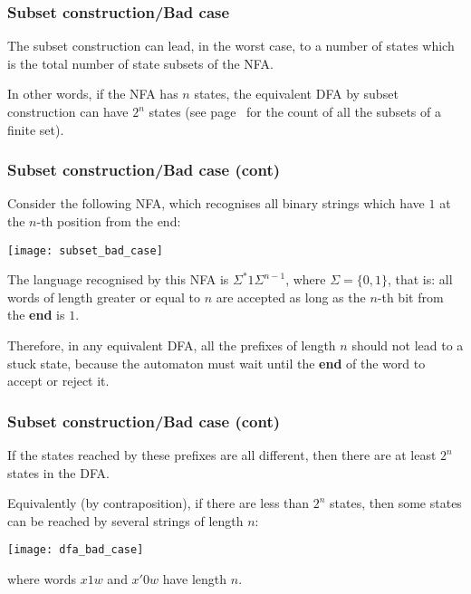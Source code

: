 % 
\begin{frame}
\frametitle{Subset construction/Bad case}

The subset construction can lead, in the worst case, to a number of
states which is the total number of state subsets of the NFA.

\bigskip

In other words, if the NFA has \(n\) states, the equivalent DFA by
subset construction can have \(2^n\) states (see
page~\pageref{state_explosion} for the count of all the subsets of a
finite set).

\end{frame}

% 
\begin{frame}
\frametitle{Subset construction/Bad case (cont)}

Consider the following NFA, which recognises all binary strings which
have \(1\) at the \(n\)-th position from the end:
\begin{center}
\texttt{[image: subset\_bad\_case]}
\end{center}
The language recognised by this NFA is \(\Sigma^{*} 1 \Sigma^{n-1}\),
where \(\Sigma=\{0,1\}\), that is: all words of length greater or
equal to \(n\) are accepted as long as the \(n\)-th bit from the
\textbf{end} is \(1\).

\bigskip

Therefore, in any equivalent DFA, all the prefixes of length \(n\)
should not lead to a stuck state, because the automaton must wait
until the \textbf{end} of the word to accept or reject it.

\end{frame}

% 
\begin{frame}
\frametitle{Subset construction/Bad case (cont)}

If the states reached by these prefixes are all different, then there
are at least \(2^n\) states in the DFA.

\bigskip

Equivalently (by contraposition), if there are less than \(2^n\)
states, then some states can be reached by several strings of length
\(n\):
\begin{center}
\texttt{[image: dfa\_bad\_case]}
\end{center}
where words \(x1w\) and \(x'0w\) have length \(n\).

\end{frame}

